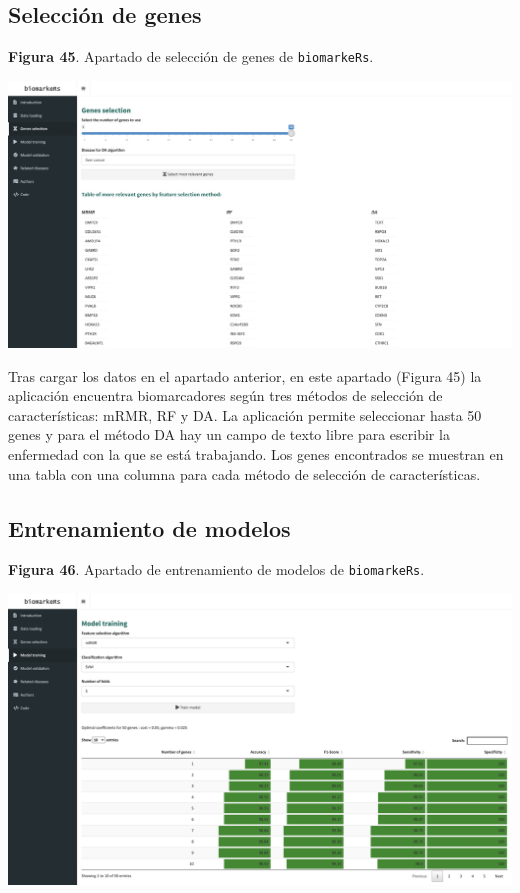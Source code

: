 \subsection{Selección de genes}

\begin{center}
	\textbf{Figura 45}. Apartado de selección de genes de \texttt{biomarkeRs}.
\end{center}

\begin{center}
	\includegraphics[width=.90\textwidth]{figuras/45_genes_selection.png} \\
\end{center}

Tras cargar los datos en el apartado anterior, en este apartado (Figura 45) la aplicación encuentra biomarcadores según tres métodos de selección de características: mRMR, RF y DA. La aplicación permite seleccionar hasta 50 genes y para el método DA hay un campo de texto libre para escribir la enfermedad con la que se está trabajando. Los genes encontrados se muestran en una tabla con una columna para cada método de selección de características.

\subsection{Entrenamiento de modelos}

\begin{center}
	\textbf{Figura 46}. Apartado de entrenamiento de modelos de \texttt{biomarkeRs}.
\end{center}

\begin{center}
	\includegraphics[width=.90\textwidth]{figuras/46_model_training.png} \\
\end{center}

